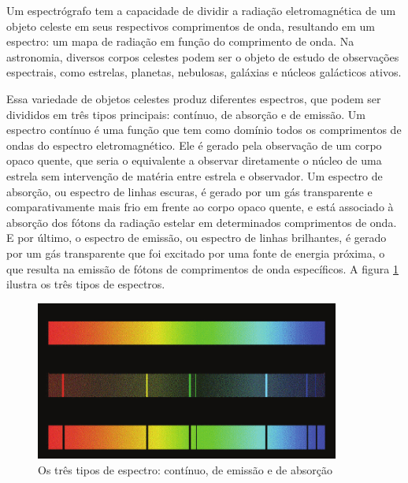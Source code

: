 Um espectrógrafo tem a capacidade de dividir a radiação eletromagnética de um objeto celeste em seus respectivos comprimentos de onda, resultando em um espectro: um mapa de radiação em função do comprimento de onda. Na astronomia, diversos corpos celestes podem ser o objeto de estudo de observações espectrais, como estrelas, planetas, nebulosas, galáxias e núcleos galácticos ativos.  


Essa variedade de objetos celestes produz diferentes espectros, que podem ser divididos em três tipos principais: contínuo, de absorção e de emissão. Um espectro contínuo é uma função que tem como domínio todos os comprimentos de ondas do espectro eletromagnético.
Ele é gerado pela observação de um corpo opaco quente, que seria o equivalente a observar diretamente o núcleo de uma estrela sem intervenção de matéria entre estrela e observador. Um espectro de absorção, ou espectro de linhas escuras, é gerado por um gás transparente e comparativamente mais frio em frente ao corpo opaco quente, e está associado à absorção dos fótons da radiação estelar em determinados comprimentos de onda. E por último, o espectro de emissão, ou espectro de linhas brilhantes, é gerado por um gás transparente que foi excitado por uma fonte de energia próxima, o que resulta na emissão de fótons de comprimentos de onda específicos. A figura \ref{fig:spectrum-types} ilustra os três tipos de espectros. 

\begin{figure}[htb]
\centering
\includegraphics[width=10cm]{figuras/Continuous-spectrum-and-two-types-of-line-spectra.png}
\caption{Os três tipos de espectro: contínuo, de emissão e de absorção \citep{mcgrawhill}}
\label{fig:spectrum-types}
\end{figure}

